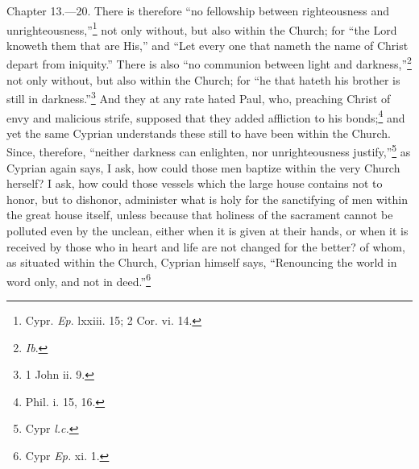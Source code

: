 
Chapter 13.—20. There is therefore ``no fellowship between righteousness and unrighteousness,''\footnote{\par  Cypr. \emph{Ep}. lxxiii. 15; 2 Cor. vi. 14.} not only without, but also within the Church; for ``the Lord knoweth them that are His,'' and ``Let every one that nameth the name of Christ depart from iniquity.'' There is also ``no communion between light and darkness,''\footnote{\par  \emph{Ib}.} not only without, but also within the Church; for ``he that hateth his brother is still in darkness.''\footnote{\par  1 John ii. 9.} And they at any rate hated Paul, who, preaching Christ of envy and malicious strife, supposed that they added affliction to his bonds;\footnote{\par  Phil. i. 15, 16.} and yet the same Cyprian understands these still to have been within the Church. Since, therefore, ``neither darkness can enlighten, nor unrighteousness justify,''\footnote{\par  Cypr \emph{l.c.}} as Cyprian again says, I ask, how could those men baptize within the very Church herself? I ask, how could those vessels which the large house contains not to honor, but to dishonor, administer what is holy for the sanctifying of men within the great house itself, unless because that holiness of the sacrament cannot be polluted even by the unclean, either when it is given at their hands, or when it is received by those who in heart and life are not changed for the better? of whom, as situated within the Church, Cyprian himself says, ``Renouncing the world in word only, and not in deed.''\footnote{\par  Cypr \emph{Ep.} xi. 1.}

